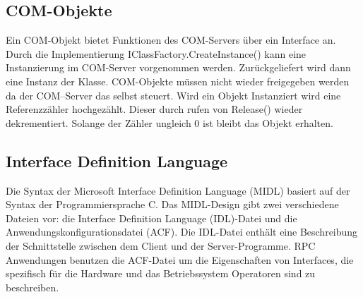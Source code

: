 \subsection{COM-Objekte}
\label{ch:grundlagen:sec:ComponentObjectModel:subsec:COMObjekte}

Ein COM-Objekt bietet Funktionen des COM-Servers über ein Interface an. Durch die Implementierung IClassFactory.CreateInstance() kann eine Instanzierung im COM-Server vorgenommen werden. Zurückgeliefert wird dann eine Instanz der Klasse. COM-Objekte müssen nicht wieder freigegeben werden da der COM–Server das selbst steuert. Wird ein Objekt Instanziert wird eine Referenzzähler hochgezählt. Dieser durch rufen von Release() wieder dekrementiert. Solange der Zähler ungleich 0 ist bleibt das Objekt erhalten. 

\subsection{Interface Definition Language}
\label{ch:grundlagen:sec:ComponentObjectModel:subsec:InterfaceDefinitionLanguage}

Die Syntax der Microsoft Interface Definition Language (MIDL) basiert auf der Syntax der Programmiersprache C. Das MIDL-Design gibt zwei verschiedene Dateien vor: die Interface Definition Language (IDL)-Datei und die Anwendungskonfigurationsdatei (ACF). Die IDL-Datei enthält eine Beschreibung der Schnittstelle zwischen dem Client und der Server-Programme. RPC Anwendungen benutzen die ACF-Datei um die Eigenschaften von Interfaces, die spezifisch für die Hardware und das Betriebssystem Operatoren sind zu beschreiben.